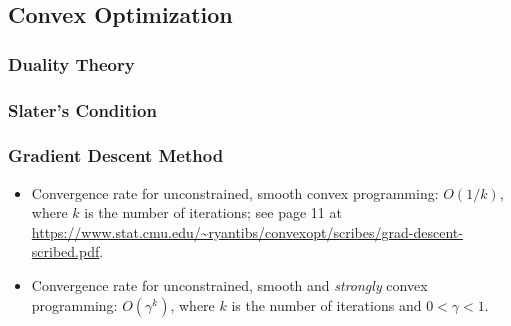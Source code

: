     
    
    
\subsection{Convex Optimization}
    \subsubsection{Duality Theory}
    
    \subsubsection{Slater's Condition}
    
    \subsubsection{Gradient Descent Method}
    \begin{itemize}
        \item Convergence rate for unconstrained, smooth convex programming: $O(1/k)$, where $k$ is the number of iterations; see page 11 at \url{https://www.stat.cmu.edu/~ryantibs/convexopt/scribes/grad-descent-scribed.pdf}.
        \item Convergence rate for unconstrained, smooth and \emph{strongly} convex programming: $O(\gamma^k)$, where $k$ is the number of iterations and $0 < \gamma < 1$.
    \end{itemize}
    
